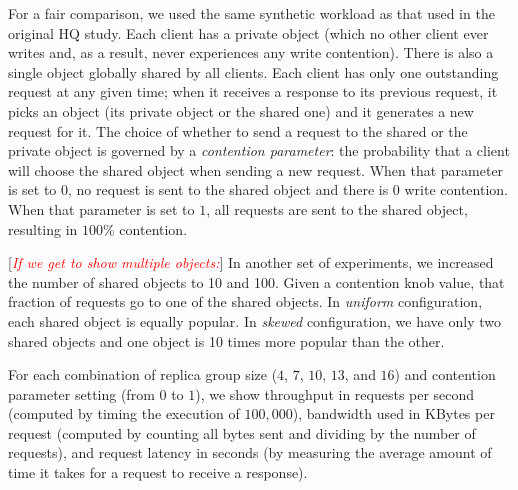\documentclass[twocolumn,10pt]{article}
\newcommand{\note}[1]{[\textcolor{red}{\textit{#1}}]}
\begin{document}
For a fair comparison, we used the same synthetic workload as that used
in the original HQ study.  Each client has a private object (which no
other client ever writes and, as a result, never experiences any write
contention). There is also a single object globally shared by all
clients.  Each client
has only one outstanding request at any given time; when it receives a
response to its previous request, it picks an object (its private object
or the shared one) and it generates a new request for it.  The choice of
whether to send a request to the shared or the private object is
governed by a \emph{contention parameter}: the probability that a client
will choose the shared object when sending a new request. When that parameter is set to
$0$, no request is sent to the shared object and there is 0 write
contention.  When that parameter is set to $1$, all requests are sent
to the shared object, resulting in $100\%$ contention.

\note{If we get to show multiple objects:} In another set of
experiments, we increased the number of shared objects to 10 and
100. Given a contention knob value, that fraction of requests go to one
of the shared objects. In \textit{uniform} configuration, each shared
object is equally popular.  In \textit{skewed} configuration, we have
only two shared objects and one object is 10 times more popular than the
other.

For each combination of replica group size ($4$, $7$, $10$, $13$, and $16$) and
contention parameter setting (from $0$ to $1$), we show throughput in
requests per second (computed by timing the execution of $100,000$),
bandwidth used in KBytes per request (computed by counting all bytes
sent and dividing by the number of requests), and request latency in
seconds (by measuring the average amount of time it takes for a request
to receive a response).
\end{document}

